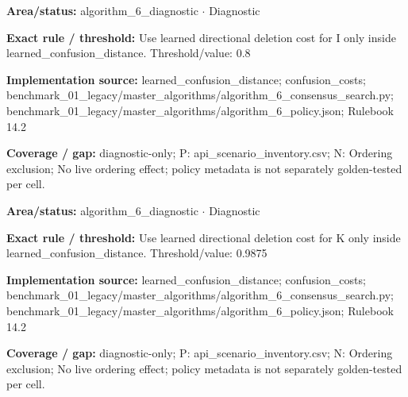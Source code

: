 \begin{tcolorbox}[enhanced,breakable,colback=white,colframe=Muted!45,boxrule=0.45pt,arc=1.5pt,left=6pt,right=6pt,top=5pt,bottom=5pt,title={\texttt{A6-LEARNED-DELETION-I}},title after break={\texttt{A6-LEARNED-DELETION-I}\ (continued)},fonttitle=\headingfont\bfseries\color{Navy},coltitle=Navy]
\textbf{Area/status:} algorithm\_\allowbreak{}6\_\allowbreak{}diagnostic $\boldsymbol{\cdot}$ Diagnostic\par
\smallskip
\textbf{Exact rule / threshold:} Use learned directional deletion cost for I only inside learned\_\allowbreak{}confusion\_\allowbreak{}distance. Threshold/\allowbreak{}value: 0.8\par
\smallskip
\textbf{Implementation source:} learned\_\allowbreak{}confusion\_\allowbreak{}distance; confusion\_\allowbreak{}costs; benchmark\_\allowbreak{}01\_\allowbreak{}legacy/\allowbreak{}master\_\allowbreak{}algorithms/\allowbreak{}algorithm\_\allowbreak{}6\_\allowbreak{}consensus\_\allowbreak{}search.py; benchmark\_\allowbreak{}01\_\allowbreak{}legacy/\allowbreak{}master\_\allowbreak{}algorithms/\allowbreak{}algorithm\_\allowbreak{}6\_\allowbreak{}policy.json; Rulebook 14.2\par
\smallskip
\textbf{Coverage / gap:} diagnostic-only; P: api\_\allowbreak{}scenario\_\allowbreak{}inventory.csv; N: Ordering exclusion; No live ordering effect; policy metadata is not separately golden-tested per cell.
\end{tcolorbox}
\begin{tcolorbox}[enhanced,breakable,colback=white,colframe=Muted!45,boxrule=0.45pt,arc=1.5pt,left=6pt,right=6pt,top=5pt,bottom=5pt,title={\texttt{A6-LEARNED-DELETION-K}},title after break={\texttt{A6-LEARNED-DELETION-K}\ (continued)},fonttitle=\headingfont\bfseries\color{Navy},coltitle=Navy]
\textbf{Area/status:} algorithm\_\allowbreak{}6\_\allowbreak{}diagnostic $\boldsymbol{\cdot}$ Diagnostic\par
\smallskip
\textbf{Exact rule / threshold:} Use learned directional deletion cost for K only inside learned\_\allowbreak{}confusion\_\allowbreak{}distance. Threshold/\allowbreak{}value: 0.9875\par
\smallskip
\textbf{Implementation source:} learned\_\allowbreak{}confusion\_\allowbreak{}distance; confusion\_\allowbreak{}costs; benchmark\_\allowbreak{}01\_\allowbreak{}legacy/\allowbreak{}master\_\allowbreak{}algorithms/\allowbreak{}algorithm\_\allowbreak{}6\_\allowbreak{}consensus\_\allowbreak{}search.py; benchmark\_\allowbreak{}01\_\allowbreak{}legacy/\allowbreak{}master\_\allowbreak{}algorithms/\allowbreak{}algorithm\_\allowbreak{}6\_\allowbreak{}policy.json; Rulebook 14.2\par
\smallskip
\textbf{Coverage / gap:} diagnostic-only; P: api\_\allowbreak{}scenario\_\allowbreak{}inventory.csv; N: Ordering exclusion; No live ordering effect; policy metadata is not separately golden-tested per cell.
\end{tcolorbox}
